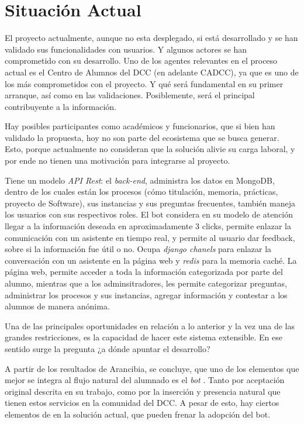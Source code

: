 \documentclass[guia]{upropuesta}
\begin{document}
\section{Situación Actual}\label{sec:sa}
    El proyecto actualmente, aunque no esta desplegado, si está desarrollado y se han validado sus funcionalidades con usuarios. Y algunos actores se han comprometido con su desarrollo. Uno de los agentes relevantes en el proceso actual es el Centro de Alumnos del DCC (en adelante CADCC), ya que es uno de los más comprometidos con el proyecto. Y qué será fundamental en su primer arranque, así como en las validaciones. Posiblemente, será el principal contribuyente a la información. 
    \par Hay posibles participantes como académicos y funcionarios, que si bien han validado la propuesta, hoy no son parte del ecosistema que se busca generar. Esto, porque actualmente no consideran que la solución alivie su carga laboral, y por ende no tienen una motivación para integrarse al proyecto.
    \par Tiene un modelo \textit{API Rest}: el \textit{back-end}, administra los datos en MongoDB, dentro de los cuales están los procesos (cómo titulación, memoria, prácticas, proyecto de Software), sus instancias y sus preguntas frecuentes, también maneja los usuarios con sus respectivos roles. El bot considera en su modelo de atención llegar a la información deseada en aproximadamente 3 clicks, permite enlazar la comunicación con un asistente en tiempo real, y permite al usuario dar feedback, sobre si la información fue útil o no. Ocupa \textit{django chanels} para enlazar la conversación con un asistente en la página web y \textit{redis} para la memoria caché. La página web, permite acceder a toda la información categorizada por parte del alumno, mientras que a los adminsitradores, les permite categorizar preguntas, administrar los procesos y sus instancias, agregar información y contestar a los alumnos de manera anónima.
    \par Una de las principales oportunidades en relación a lo anterior y la vez una de las grandes restricciones, es la capacidad de hacer este sistema extensible. En ese sentido surge la pregunta ¿a dónde apuntar el desarrollo? 
    \par A partir de los resultados de Arancibia, se concluye, que uno de los elementos que mejor se integra al flujo natural del alumnado es el \textit{bot} \cite{ARANCIBIA2021}. Tanto por aceptación original descrita en su trabajo, como por la inserción y presencia natural que tienen estos servicios en la comunidad del DCC. A pesar de esto, hay ciertos elementos de en la solución actual, que pueden frenar la adopción del bot.
\end{document}
